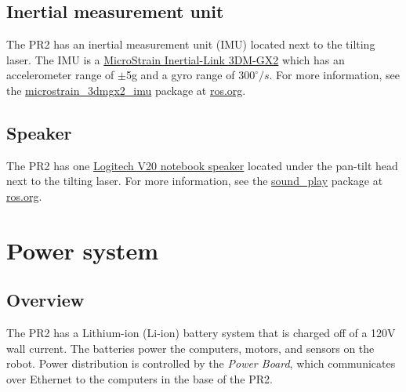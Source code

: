 \subsection{Inertial measurement unit}
The PR2 has an inertial measurement unit (IMU) located next to the tilting
laser. The IMU is a \href{http://www.microstrain.com/3dm-gx2.aspx}{MicroStrain
  Inertial-Link 3DM-GX2} which has an accelerometer range of $\pm$5g and a gyro
range of $300^\circ/s$. For more information, see the
\href{http://www.ros.org/wiki/microstrain_3dmgx2_imu}{microstrain\_3dmgx2\_imu}
package at \href{http://www.ros.org}{ros.org}.

\subsection{Speaker}
The PR2 has one
\href{http://www.logitech.com/index.cfm/speakers_audio/home_pc_speakers/devices/199&cl=us,en}{Logitech
  V20 notebook speaker} located under the pan-tilt head next to the tilting
laser. For more information, see the
\href{http://www.ros.org/wiki/sound_play}{sound\_play} package at
\href{http://www.ros.org}{ros.org}.

\section{Power system}
\subsection{Overview}
The PR2 has a Lithium-ion (Li-ion) battery system that is charged off of a 120V
wall current. The batteries power the computers, motors, and sensors on the
robot.  Power distribution is controlled by the \emph{Power Board}, which
communicates over Ethernet to the computers in the base of the PR2.
